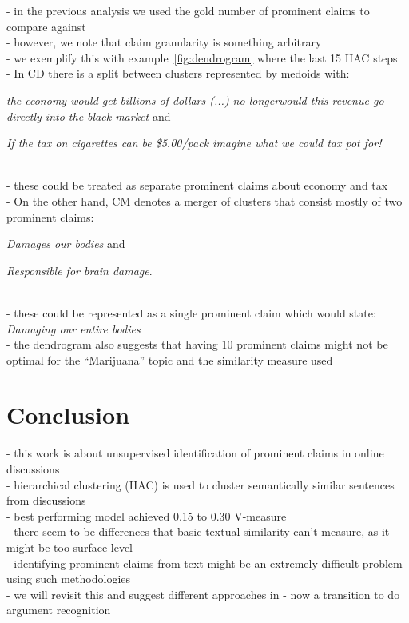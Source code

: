 \noindent - in the previous analysis we used the gold number of prominent claims to compare
against \\
- however, we note that claim granularity is something arbitrary \\
- we exemplify this with example~\ref{fig:dendrogram} where the last 15 HAC steps \\
- In CD there is a split between clusters represented by medoids with: 
\begin{enumerate*}[label=\arabic*)]
\item \textit{the economy would get billions of dollars (...) no longerwould this revenue
go directly into the black market} and 
\item \textit{If the tax on cigarettes can
be \$5.00/pack imagine what we could tax pot for!}
\end{enumerate*}\\
- these could be treated as separate prominent claims about economy and tax \\
- On the other hand,  CM denotes a merger of clusters that consist mostly of two prominent claims: 
\begin{enumerate*}[label=\arabic*)]
\item \textit{Damages our bodies} and 
\item \textit{Responsible for brain damage}.
\end{enumerate*}  \\
- these could be represented as a single prominent claim which would state: 
\textit{Damaging our entire bodies} \\
- the dendrogram also suggests that having 10 prominent claims might not be optimal 
for the ``Marijuana'' topic and the similarity measure used \\

\section{Conclusion}

- this work is about unsupervised identification of prominent claims in online 
discussions \\
- hierarchical clustering (HAC) is used to cluster semantically similar sentences from 
discussions \\
- best performing model achieved 0.15 to 0.30 V-measure \\
- there seem to be differences that basic textual similarity can't measure, as it might be
too surface level \\
- identifying prominent claims from text might be an extremely difficult problem using 
such methodologies \\
- we will revisit this and suggest different approaches in 
- now a transition to do argument recognition \\

